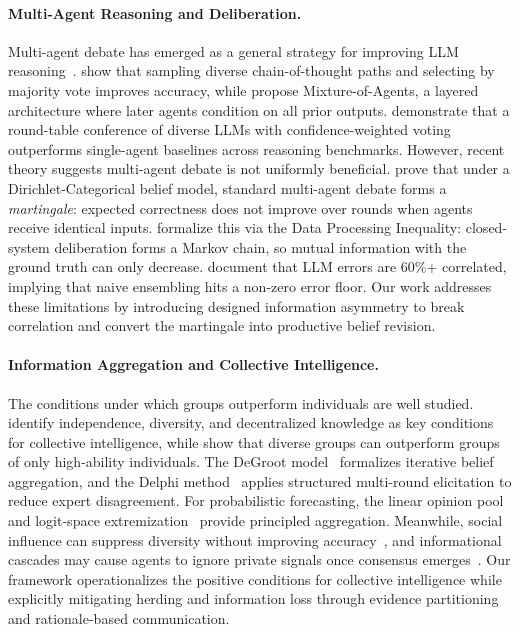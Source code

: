 \documentclass[11pt]{article}
\theoremstyle{plain}
\theoremstyle{definition}
\begin{document}
\paragraph{Multi-Agent Reasoning and Deliberation.}
Multi-agent debate has emerged as a general strategy for improving LLM reasoning~\citep{du2023improving}.
\citet{wangself} show that sampling diverse chain-of-thought paths and selecting by majority vote improves accuracy, while \citet{wangmixture} propose Mixture-of-Agents, a layered architecture where later agents condition on all prior outputs.
\citet{chen2024reconcile} demonstrate that a round-table conference of diverse LLMs with confidence-weighted voting outperforms single-agent baselines across reasoning benchmarks.
However, recent theory suggests multi-agent debate is not uniformly beneficial.
\citet{choi2025debate} prove that under a Dirichlet-Categorical belief model, standard multi-agent debate forms a \textit{martingale}: expected correctness does not improve over rounds when agents receive identical inputs.
\citet{shin2026reasoning} formalize this via the Data Processing Inequality: closed-system deliberation forms a Markov chain, so mutual information with the ground truth can only decrease.
\citet{kim2025correlated} document that LLM errors are 60\%+ correlated, implying that naive ensembling hits a non-zero error floor.
Our work addresses these limitations by introducing designed information asymmetry to break correlation and convert the martingale into productive belief revision.

\vspace{-0.5em}

\paragraph{Information Aggregation and Collective Intelligence.}
The conditions under which groups outperform individuals are well studied.
\citet{surowiecki2004wisdom} identify independence, diversity, and decentralized knowledge as key conditions for collective intelligence, while \citet{hong2004groups} show that diverse groups can outperform groups of only high-ability individuals.
The DeGroot model~\citep{612bb50a-4bdd-3a32-b6eb-7837600cc9c4} formalizes iterative belief aggregation, and the Delphi method~\citep{DALKEY1969408} applies structured multi-round elicitation to reduce expert disagreement.
For probabilistic forecasting, the linear opinion pool~\citep{9ca5e582-1e4c-323f-9ab1-c62032d22e48} and logit-space extremization~\citep{SATOPAA2014344} provide principled aggregation.
Meanwhile, social influence can suppress diversity without improving accuracy~\citep{Lorenz2011HowSI}, and informational cascades may cause agents to ignore private signals once consensus emerges~\citep{bikhchandani1992theory}.
Our framework operationalizes the positive conditions for collective intelligence while explicitly mitigating herding and information loss through evidence partitioning and rationale-based communication.
\end{document}
